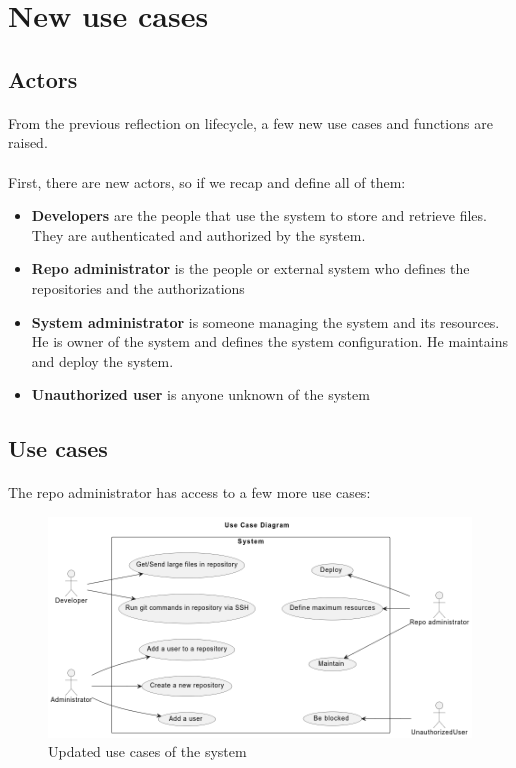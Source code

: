 \newpage
\section{New use cases}

\subsection{Actors}

\paragraph{}
From the previous reflection on lifecycle, a few new use cases and functions are raised.

\paragraph{}
First, there are new actors, so if we recap and define all of them:

\begin{itemize}
    \item \textbf{Developers} are the people that use the system to store and retrieve files. They are authenticated and authorized by the system.
    \item \textbf{Repo administrator} is the people or external system who defines the repositories and the authorizations
    \item \textbf{System administrator} is someone managing the system and its resources. He is owner of the system and defines the system configuration. He maintains and deploy the system.
    \item \textbf{Unauthorized user} is anyone unknown of the system
\end{itemize}

\subsection{Use cases}

\paragraph{}
The repo administrator has access to a few more use cases:

\begin{figure}[h]
    \centering
    \includegraphics[width=\textwidth]{iteration_01/diagrams/admin_use_cases.png}
    \caption{Updated use cases of the system}
    \label{fig:admin_use_cases}
\end{figure}

